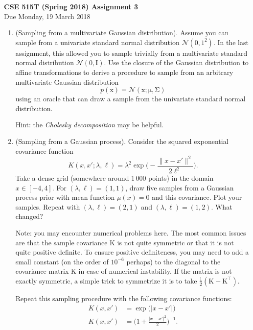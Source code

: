\documentclass{article}
\newcommand{\mc}[1]{\mathcal{#1}}
\newcommand{\mat}[1]{\bm{\mathrm{#1}}}
\renewcommand{\vec}[1]{\bm{\mathrm{#1}}}
\newcommand{\trans}{^\top}
\begin{document}
{\large \textbf{CSE 515T (Spring 2018) Assignment 3}} \\
Due Monday, 19 March 2018 \\

\begin{enumerate}

\item
  (Sampling from a multivariate Gaussian distribution).  Assume you can sample
  from a univariate standard normal distribution $\mc{N}(0, 1^2)$.  In the last
  assignment, this allowed you to sample trivially from a multivariate standard
  normal distribution $\mc{N}(\vec{0}, \mat{I})$.  Use the closure of the
  Gaussian distribution to affine transformations to derive a procedure to
  sample from an arbitrary multivariate Gaussian distribution
  \[
    p(\vec{x}) = \mc{N}(\vec{x}; \vec{\mu}, \mat{\Sigma})
  \]
  using an oracle that can draw a sample from the univariate standard normal
  distribution.

  Hint: the \emph{Cholesky decomposition} may be helpful.

\item
  (Sampling from a Gaussian process).
  Consider the squared exponential covariance function
  \begin{equation}
    \label{sqdexp}
    K(x, x'; \lambda, \ell)
    =
    \lambda^2
    \exp\biggl(
    -\frac{\lVert x - x' \rVert^2}{2\ell^2}
    \biggr).
  \end{equation}
  Take a dense grid (somewhere around 1\,000 points) in the domain $x \in [-4,
    4]$.  For $(\lambda, \ell) = (1, 1)$, draw five samples from a Gaussian
  process prior with mean function $\mu(x) = 0$ and this covariance.  Plot your
  samples.  Repeat with $(\lambda, \ell) = (2, 1)$ and $(\lambda, \ell) = (1,
  2)$.  What changed?

  Note: you may encounter numerical problems here.  The most common issues are
  that the sample covariance $\mat{K}$ is not quite symmetric or that it is not
  quite positive definite.  To ensure positive definiteness, you may need to add
  a small constant (on the order of $10^{-6}$ perhaps) to the diagonal to the
  covariance matrix $\mat{K}$ in case of numerical instability.  If the matrix
  is not exactly symmetric, a simple trick to symmetrize it is to take
  $\frac{1}{2}(\mat{K} + \mat{K}\trans)$.

  Repeat this sampling procedure with the following covariance functions:
  \begin{align*}
    K(x, x')
    &=
    \exp\bigl(\lvert x - x' \rvert\bigr)
    \\
    K(x, x')
    &=
    \biggl(1 + \frac{\lvert x - x' \rvert^2}{2}\biggr)^{-1}.
  \end{align*}


\end{enumerate}
\end{document}
